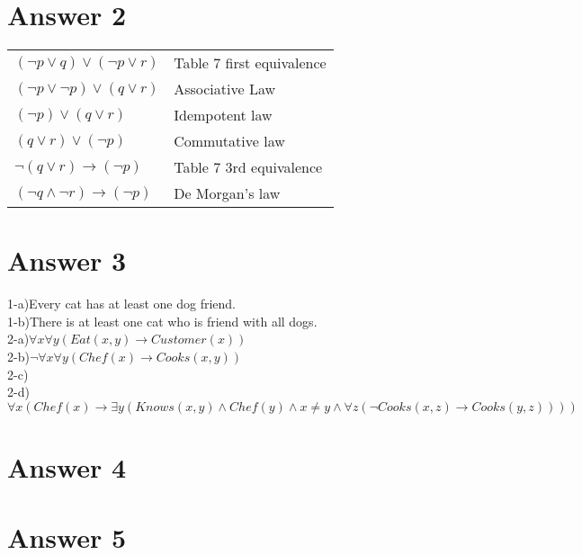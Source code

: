 \documentclass[12pt]{article}
\begin{document}
\section*{Answer 2}


\begin{table}[H]
	\centering
	\begin{tabular}{*2{l}}
	$(\neg p \vee q) \vee  (\neg p \vee r)$	&  Table 7 first equivalence \\ 
	$(\neg p \vee \neg p) \vee  (q \vee r)$&  Associative Law \\
	$(\neg p) \vee  (q \vee r)$& Idempotent law \\
	$(q \vee r)\vee(\neg p)$& Commutative law \\
	$\neg(q \vee r)\rightarrow(\neg p)$& Table 7 3rd equivalence \\
	$(\neg q \wedge \neg r)\rightarrow(\neg p)$& De Morgan's law \\
	\end{tabular}
\end{table}


\section*{Answer 3}

1-a)Every cat has at least one dog friend. \\
1-b)There is at least one cat who is friend with all dogs.\\
2-a)$\forall x \forall y (Eat(x,y) \rightarrow Customer(x)) $ \\
2-b)$\neg \forall x \forall y (Chef(x) \rightarrow Cooks(x,y)) $ \\
2-c) \\
2-d) $\forall x (Chef(x) \rightarrow \exists y (Knows(x,y) \wedge Chef(y) \wedge x \neq y \wedge \forall z (\neg Cooks(x,z) \rightarrow Cooks(y,z)))) $ \\


\section*{Answer 4}


\section*{Answer 5}
\end{document}
